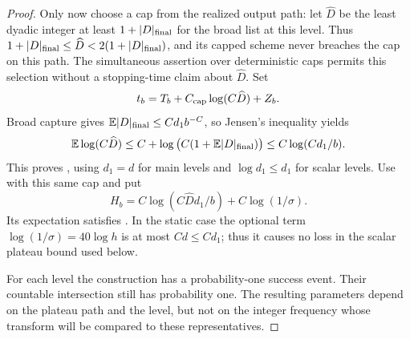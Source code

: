 \begin{proof}
Only now choose a cap from the realized output path: let
$\widehat D$ be the least dyadic integer at least
$1+|D|_{\rm final}$ for the broad list at this level.  Thus
$1+|D|_{\rm final}\le\widehat D<2(1+|D|_{\rm final})$, and its capped
scheme never breaches the cap on this path.  The simultaneous assertion
over deterministic caps permits this selection without a stopping-time
claim about $\widehat D$.  Set
\[
 t_b=T_b+C_{\rm cap}\log(C\widehat D)+Z_b.
\]
Broad capture gives $\mathbb E|D|_{\rm final}\le Cd_1b^{-C}$, so Jensen's
inequality yields
\[
 \mathbb E\log(C\widehat D)
 \le C+\log\big(C(1+\mathbb E|D|_{\rm final})\big)
 \le C\log(Cd_1/b).
\]
This proves , using
$d_1=d$ for main levels and $\log d_1\le d_1$ for scalar levels.
Use  with this same cap and put
\[
 H_b=C\log(C\widehat Dd_1/b)+C\log(1/\sigma).
\]
Its expectation satisfies .  In the static
case the optional term $\log(1/\sigma)=40\log h$ is at most $Cd\le Cd_1$;
thus it causes no loss in the scalar plateau bound used below.

For each level the construction has a probability-one success event.
Their countable intersection still has probability one.  The resulting
parameters depend on the plateau path and the level, but not on the
integer frequency whose transform will be compared to these
representatives.
\end{proof}
